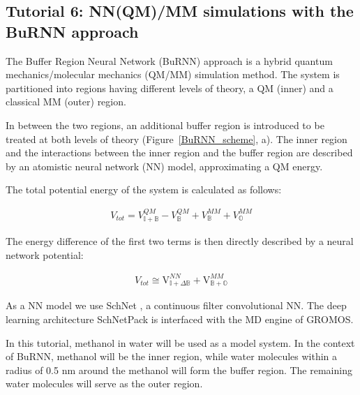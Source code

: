 
\subsection{Tutorial 6: NN(QM)/MM simulations with the BuRNN approach}

The Buffer Region Neural Network (BuRNN) approach \cite{Lier2022BuRNN} is a hybrid quantum mechanics/molecular mechanics (QM/MM) \cite{Warshel1976QM/MM, Senn2009QM/MM} simulation method. The system is partitioned into regions having different levels of theory, a QM (inner) and a classical MM (outer) region. 

In between the two regions, an additional buffer region is introduced to be treated at both levels of theory (Figure~\ref{BuRNN_scheme}, a). The inner region and the interactions between the inner region and the buffer region are described by an atomistic neural network (NN) model, approximating a QM energy.

The total potential energy of the system is calculated as follows:

\begin{equation}
  \begin{aligned}
  V_{tot} = V^{QM}_{\mathbb{I+B}} - V^{QM}_{\mathbb{B}} + V^{MM}_{\mathbb{B}} + V^{MM}_{\mathbb{O}}
    \end{aligned}
\end{equation}


 The energy difference of the first two terms is then directly described by a neural network potential: 
 
\begin{equation}
  \begin{aligned}
  V_{tot} \cong \mathrm{V}_{\mathbb{I+}\Delta\mathbb{B}}^{NN} + \mathrm{V}_{\mathbb{B+O}}^{MM}
    \end{aligned}
\end{equation}


As a NN model we use SchNet \cite{Schuett2017SchNet, Schuett2018SchNet}, a continuous filter convolutional NN. The deep learning architecture SchNetPack \cite{Schuett2019SPK} is interfaced with the MD engine of GROMOS.



In this tutorial, methanol in water will be used as a model system. In the context of BuRNN, methanol will be the inner region, while water molecules within a radius of 0.5 nm around the methanol will form the buffer region. The remaining water molecules will serve as the outer region. 

